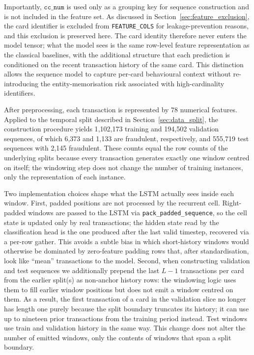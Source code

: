 \documentclass[oneside,12pt,parskip=half,american,numbers=noenddot]{scrreprt}
\begin{document}
Importantly, \(\texttt{cc\_num}\) is used only as a grouping key for sequence construction and is not included in the feature set. As discussed in Section~\ref{sec:feature_exclusion}, the card identifier is excluded from \texttt{FEATURE\_COLS} for leakage-prevention reasons, and this exclusion is preserved here. The card identity therefore never enters the model tensor; what the model sees is the same row-level feature representation as the classical baselines, with the additional structure that each prediction is conditioned on the recent transaction history of the same card. This distinction allows the sequence model to capture per-card behavioural context without re-introducing the entity-memorisation risk associated with high-cardinality identifiers.

After preprocessing, each transaction is represented by 78 numerical features. Applied to the temporal split described in Section~\ref{sec:data_split}, the construction procedure yields 1{,}102{,}173 training and 194{,}502 validation sequences, of which 6{,}373 and 1{,}133 are fraudulent, respectively, and 555{,}719 test sequences with 2{,}145 fraudulent. These counts equal the row counts of the underlying splits because every transaction generates exactly one window centred on itself; the windowing step does not change the number of training instances, only the representation of each instance.

Two implementation choices shape what the LSTM actually sees inside each window. First, padded positions are not processed by the recurrent cell. Right-padded windows are passed to the LSTM via \texttt{pack\_padded\_sequence}, so the cell state is updated only by real transactions; the hidden state read by the classification head is the one produced after the last valid timestep, recovered via a per-row gather. This avoids a subtle bias in which short-history windows would otherwise be dominated by zero-feature padding rows that, after standardisation, look like ``mean'' transactions to the model. Second, when constructing validation and test sequences we additionally prepend the last $L-1$ transactions per card from the earlier split(s) as non-anchor history rows: the windowing logic uses them to fill earlier window positions but does not emit a window centred on them. As a result, the first transaction of a card in the validation slice no longer has length one purely because the split boundary truncates its history; it can use up to nineteen prior transactions from the training period instead. Test windows use train and validation history in the same way. This change does not alter the number of emitted windows, only the contents of windows that span a split boundary.
\end{document}
